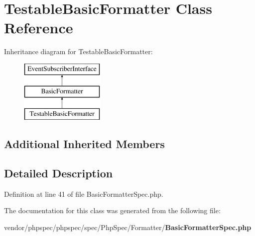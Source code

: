 \section{Testable\+Basic\+Formatter Class Reference}
\label{classspec_1_1_php_spec_1_1_formatter_1_1_testable_basic_formatter}
Inheritance diagram for Testable\+Basic\+Formatter\+:\begin{figure}[H]
\begin{center}
\leavevmode
\includegraphics[height=3.000000cm]{classspec_1_1_php_spec_1_1_formatter_1_1_testable_basic_formatter}
\end{center}
\end{figure}
\subsection*{Additional Inherited Members}


\subsection{Detailed Description}


Definition at line 41 of file Basic\+Formatter\+Spec.\+php.



The documentation for this class was generated from the following file\+:\begin{DoxyCompactItemize}
\item 
vendor/phpspec/phpspec/spec/\+Php\+Spec/\+Formatter/{\bf Basic\+Formatter\+Spec.\+php}\end{DoxyCompactItemize}
